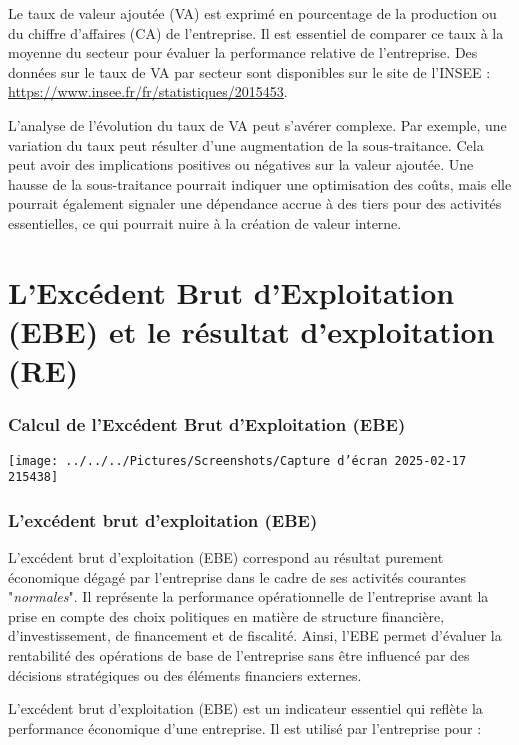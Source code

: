 \documentclass[a4paper, 12pt]{report}
\begin{document}
Le taux de valeur ajoutée (VA) est exprimé en pourcentage de la production ou du chiffre d'affaires (CA) de l'entreprise. Il est essentiel de comparer ce taux à la moyenne du secteur pour évaluer la performance relative de l'entreprise. Des données sur le taux de VA par secteur sont disponibles sur le site de l'INSEE : \url{https://www.insee.fr/fr/statistiques/2015453}.

L'analyse de l'évolution du taux de VA peut s'avérer complexe. Par exemple, une variation du taux peut résulter d'une augmentation de la sous-traitance. Cela peut avoir des implications positives ou négatives sur la valeur ajoutée. Une hausse de la sous-traitance pourrait indiquer une optimisation des coûts, mais elle pourrait également signaler une dépendance accrue à des tiers pour des activités essentielles, ce qui pourrait nuire à la création de valeur interne.

\section{L'Excédent Brut d'Exploitation (EBE) et le résultat d'exploitation (RE)}

\subsubsection{Calcul de l'Excédent Brut d'Exploitation (EBE)}

\begin{center}
	\texttt{[image: ../../../Pictures/Screenshots/Capture d'écran 2025-02-17 215438]}
\end{center}

\subsubsection{L'excédent brut d'exploitation (EBE)}

L'excédent brut d'exploitation (EBE) correspond au résultat purement économique dégagé par l'entreprise dans le cadre de ses activités courantes "\textit{normales}". Il représente la performance opérationnelle de l'entreprise avant la prise en compte des choix politiques en matière de structure financière, d'investissement, de financement et de fiscalité. Ainsi, l'EBE permet d'évaluer la rentabilité des opérations de base de l'entreprise sans être influencé par des décisions stratégiques ou des éléments financiers externes.

L'excédent brut d'exploitation (EBE) est un indicateur essentiel qui reflète la performance économique d'une entreprise. Il est utilisé par l'entreprise pour :
\end{document}
